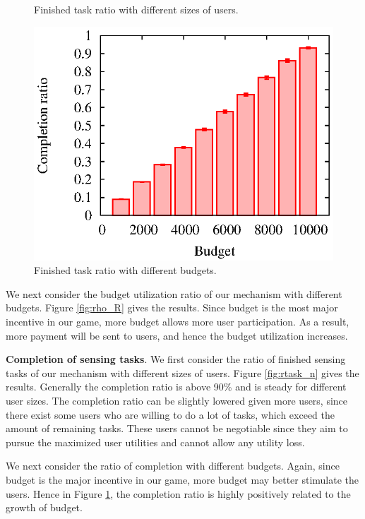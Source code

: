 \documentclass[conference]{IEEEtran}
\theoremstyle{definition}
\begin{document}
{\begin{figure}[!t]
\begin{minipage}{0.31\textwidth}
\caption{Finished task ratio with different sizes of users.}
\label{fig:rtask_n}
\end{minipage}
\hspace{0.01cm}
\begin{minipage}{0.31\textwidth}
\includegraphics[width=\textwidth]{collusion_resist_codes/images/img_rtask.eps}
\caption{Finished task ratio with different budgets.}
\label{fig:rtask_R}
\end{minipage}
\end{figure}

We next consider the budget utilization ratio of our mechanism with different budgets. Figure \ref{fig:rho_R} gives the results. Since budget is the most major incentive in our game, more budget allows more user participation. As a result, more payment will be sent to users, and hence the budget utilization increases.

{\bf Completion of sensing tasks}. We first consider the ratio of finished sensing tasks of our mechanism with different sizes of users. Figure \ref{fig:rtask_n} gives the results. Generally the completion ratio is above 90\% and is steady for different user sizes. The completion ratio can be slightly lowered given more users, since there exist some users who are willing to do a lot of tasks, which exceed the amount of remaining tasks. These users cannot be negotiable since they aim to pursue the maximized user utilities and cannot allow any utility loss. 

We next consider the ratio of completion with different budgets. Again, since budget is the major incentive in our game, more budget may better stimulate the users. Hence in Figure \ref{fig:rtask_R}, the completion ratio is highly positively related to the growth of budget.

}
\end{document}
